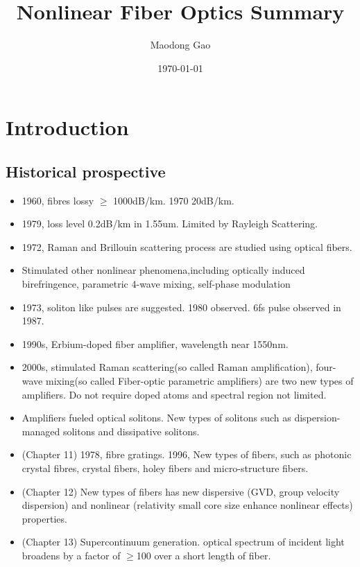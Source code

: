 \documentclass[12pt]{extarticle}
\title{Nonlinear Fiber Optics\cite{agrawal_nonlinear_2007} Summary}
\author{Maodong Gao}
\date{\today}
\newcommand{\<}{\langle}
\renewcommand{\>}{\rangle}
\theoremstyle{definition}
\begin{document}
\maketitle

\section{Introduction}

    \subsection{Historical prospective}
    
        \begin{itemize}
            \item 1960, fibres lossy $\geq$ 1000dB/km. 1970 20dB/km.
            \item 1979, loss level 0.2dB/km in 1.55um. Limited by Rayleigh Scattering.
            \item 1972, Raman and Brillouin scattering process are studied using optical fibers.
            \item Stimulated other nonlinear phenomena,including optically induced birefringence, parametric 4-wave mixing, self-phase modulation
            \item 1973, soliton like pulses are suggested. 1980 observed. 6fs pulse observed in 1987.
            \item 1990s, Erbium-doped fiber amplifier, wavelength near 1550nm.
            \item 2000s, stimulated Raman scattering(so called Raman amplification), four-wave mixing(so called Fiber-optic parametric amplifiers) are two new types of amplifiers. Do not require doped atoms and spectral region not limited.
            \item Amplifiers fueled optical solitons. New types of solitons such as dispersion-managed solitons and dissipative solitons.
            \item (Chapter 11) 1978, fibre gratings. 1996, New types of fibers, such as photonic crystal fibres, crystal fibers,  holey fibers and micro-structure fibers.
            \item (Chapter 12) New types of fibers has new dispersive (GVD, group velocity dispersion) and nonlinear (relativity small core size enhance nonlinear effects) properties.
            \item (Chapter 13) Supercontinuum generation. optical spectrum of incident light broadens by a factor of $\geq$100 over a short length of fiber.
        \end{itemize}
    
\end{document}
